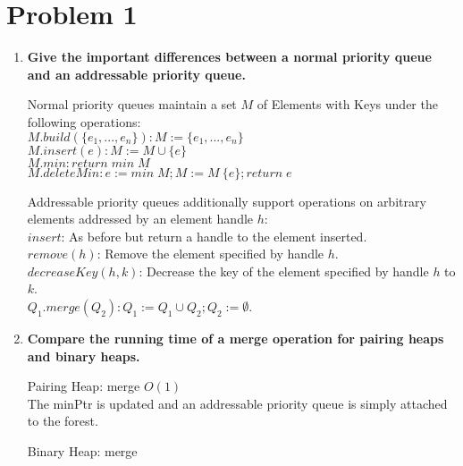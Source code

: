 \section{Problem 1}

\begin{enumerate}
    \item \textbf{Give the important differences between a normal priority queue and an addressable priority queue.}
    
    Normal priority queues maintain a set $M$ of Elements with Keys under the following operations: \\
    $M.build(\{e_1,...,e_n\}): M :=\{e_1,...,e_n\}$ \\
    $M.insert(e): M := M \cup \{e\}$ \\
    $M.min: return \; min \; M$ \\
    $M.deleteMin: e:=min \; M; M :=M \ \{e\}; return \; e$

    Addressable priority queues additionally support operations on arbitrary elements addressed by an element handle $h$: \\
    $insert$: As before but return a handle to the element inserted. \\
    $remove(h)$: Remove the element specified by handle $h$. \\
    $decreaseKey(h,k)$: Decrease the key of the element specified by handle $h$ to $k$. \\
    $Q_1.merge(Q_2): Q_1:= Q_1 \cup Q_2; Q_2 := \emptyset$.

    \item \textbf{Compare the running time of a merge operation for pairing heaps and binary heaps.}
    
    Pairing Heap: merge $O(1)$ \\
    The minPtr is updated and an addressable priority queue is simply attached to the forest.
    
    Binary Heap: merge
    
    

\end{enumerate}

